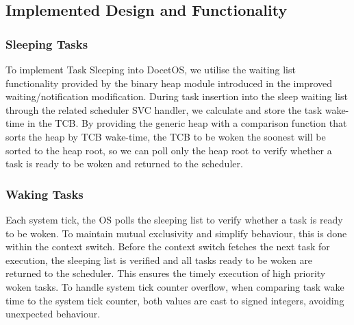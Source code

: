 \subsection{Implemented Design and Functionality}
\subsubsection{Sleeping Tasks}
To  implement Task Sleeping into DocetOS, we utilise the waiting list functionality provided by the binary heap module introduced in the improved waiting/notification modification. During task insertion into the sleep waiting list through the related scheduler SVC handler, we calculate and store the task wake-time in the TCB. By providing the generic heap with a comparison function that sorts the heap by TCB wake-time, the TCB to be woken the soonest will be sorted to the heap root, so we can poll only the heap root to verify whether a task is ready to be woken and returned to the scheduler.

\subsubsection{Waking Tasks}
Each system tick, the OS polls the sleeping list to verify whether a task is ready to be woken. To maintain mutual exclusivity and simplify behaviour, this is done within the context switch. Before the context switch fetches the next task for execution, the sleeping list is verified and all tasks ready to be woken are returned to the scheduler. This ensures the timely execution of high priority woken tasks. \hfill\newline
To handle system tick counter overflow, when comparing task wake time to the system tick counter, both values are cast to signed integers, avoiding unexpected behaviour.

